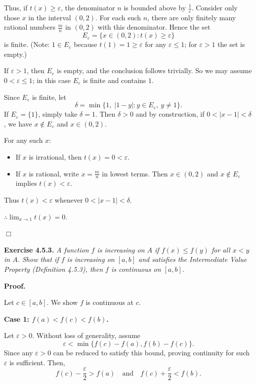 \documentclass[reqno,11pt]{amsart}
\begin{document}
Thus, if \(t(x) \geq \varepsilon\), the denominator \(n\) is bounded above by \(\frac{1}{\varepsilon}\).  
Consider only those \(x\) in the interval \((0,2)\). For each such \(n\), there are only finitely many rational numbers \(\frac{m}{n}\) in \((0,2)\) with this denominator. Hence the set
\[
E_\varepsilon = \{x \in (0,2) : t(x) \geq \varepsilon\}
\]
is finite. (Note: \(1 \in E_\varepsilon\) because \(t(1)=1 \geq \varepsilon\) for any \(\varepsilon \leq 1\); for \(\varepsilon >1\) the set is empty.)

If \(\varepsilon > 1\), then \(E_\varepsilon\) is empty, and the conclusion follows trivially. So we may assume \(0 < \varepsilon \le 1\); in this case \(E_\varepsilon\) is finite and contains \(1\).

Since \(E_\varepsilon\) is finite, let
\[
\delta = \min\{1,\; |1 - y| : y \in E_\varepsilon,\ y \neq 1\}.
\]
If \(E_\varepsilon = \{1\}\), simply take \(\delta = 1\). Then \(\delta > 0\) and by construction, if \(0 < |x-1| < \delta\), we have \(x \notin E_\varepsilon\) and \(x \in (0,2)\).

For any such \(x\):
\begin{itemize}
    \item If \(x\) is irrational, then \(t(x)=0<\varepsilon\).
    \item If \(x\) is rational, write \(x = \frac{m}{n}\) in lowest terms. Then \(x \in (0,2)\) and \(x \notin E_\varepsilon\) implies \(t(x) < \varepsilon\).
\end{itemize}
Thus \(t(x) < \varepsilon\) whenever \(0 < |x-1| < \delta\).

$\therefore \lim_{x \to 1} t(x) = 0.$

\hfill$\Box$

\newpage

\noindent\textbf{Exercise 4.5.3.}  
\textit{A function $f$ is increasing on $A$ if $f(x) \leq f(y)$ for all $x < y$ in $A$. Show that if $f$ is increasing on $[a,b]$ and satisfies the Intermediate Value Property (Definition 4.5.3), then $f$ is continuous on $[a,b]$.} 
\medskip

\noindent\textbf{Proof.}

Let \(c \in [a,b]\). We show \(f\) is continuous at \(c\).

\medskip
\noindent\textbf{Case 1: \(f(a) < f(c) < f(b)\).}

Let \(\varepsilon > 0\). Without loss of generality, assume
\[
\varepsilon < \min\{f(c) - f(a), f(b) - f(c)\}.
\]
Since any $\varepsilon>0$ can be reduced to satisfy this bound, proving continuity for such $\varepsilon$ is sufficient. Then,
\[
f(c) - \frac{\varepsilon}{2} > f(a) \quad \text{and} \quad f(c) + \frac{\varepsilon}{2} < f(b).
\]
\end{document}

